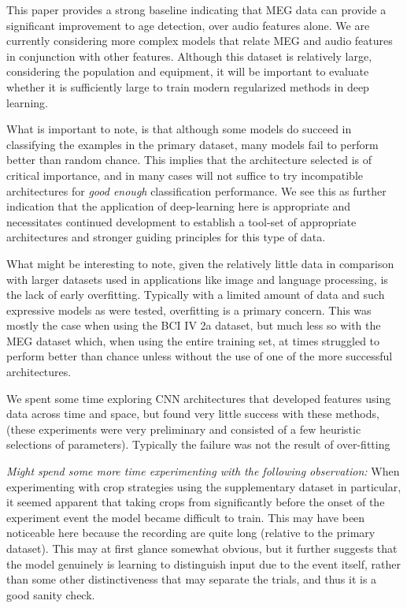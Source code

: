 \documentclass[utf8]{frontiersSCNS} %
\begin{document}
This paper provides a strong baseline indicating that MEG data can provide a significant improvement to age detection, over audio features alone. We are currently considering more complex models that relate MEG and audio features in conjunction with other features. Although this dataset is relatively large, considering the population and equipment, it will be important to evaluate whether it is sufficiently large to train modern regularized methods in deep learning.


What is important to note, is that although some models do succeed in classifying the examples in the primary dataset, many models fail to perform better than random chance. This implies that the architecture selected is of critical importance, and in many cases will not suffice to try incompatible architectures for {\em good enough} classification performance. We see this as further indication that the application of deep-learning here is appropriate and necessitates continued development to establish a tool-set of appropriate architectures and stronger guiding principles for this type of data.

What might be interesting to note, given the relatively little data in comparison with larger datasets used in applications like image and language processing, is the lack of early overfitting. Typically with a limited amount of data and such expressive models as were tested, overfitting is a primary concern. This was mostly the case when using the BCI IV 2a dataset, but much less so with the MEG dataset which, when using the entire training set, at times struggled to perform better than chance unless without the use of one of the more successful architectures.

We spent some time exploring CNN architectures that developed features using data across time and space, but found very little success with these methods, (these experiments were very preliminary and consisted of a few heuristic selections of parameters). Typically the failure was not the result of over-fitting

{\em Might spend some more time experimenting with the following observation:} When experimenting with crop strategies using the supplementary dataset in particular, it seemed apparent that taking crops from significantly before the onset of the experiment event the model became difficult to train. This may have been noticeable here because the recording are quite long (relative to the primary dataset). This may at first glance somewhat obvious, but it further suggests that the model genuinely is learning to distinguish input due to the event itself, rather than some other distinctiveness that may separate the trials, and thus it is a good sanity check.
\end{document}
